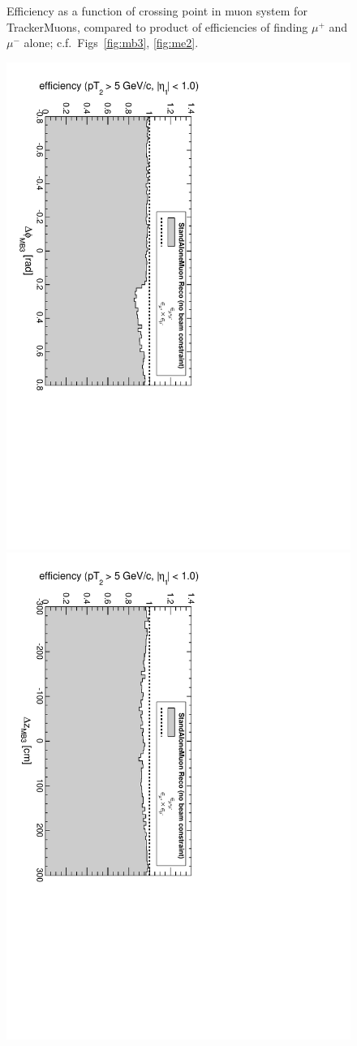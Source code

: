 \documentclass[12pt]{article}
\begin{document}
\begin{figure}[p]
\caption{Efficiency as a function of crossing point in muon system for TrackerMuons,
  compared to product of efficiencies of finding $\mu^+$ and $\mu^-$
  alone; c.f.\ Figs~\ref{fig:mb3}, \ref{fig:me2}.}
\end{figure}

\begin{figure}[p]
\includegraphics[height=0.5\linewidth, angle=90]{fig/acceptance7_plot/vsmb3dphi_StandAloneDefault.pdf}
\includegraphics[height=0.5\linewidth, angle=90]{fig/acceptance7_plot/vsmb3dz_StandAloneDefault.pdf}


\end{figure}
\end{document}
